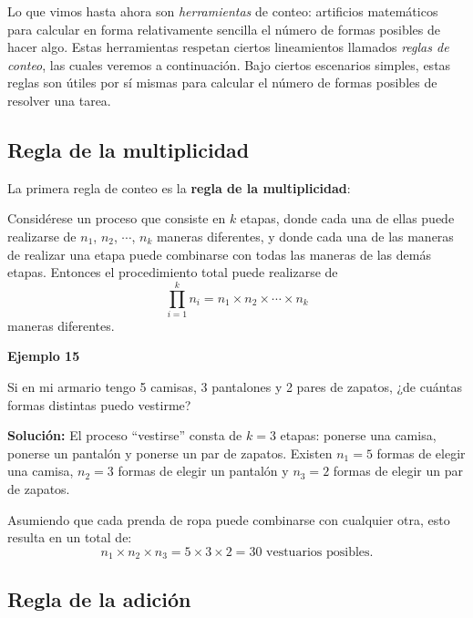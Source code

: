 \documentclass[
  letterpaper,
  DIV=11,
  numbers=noendperiod]{scrreprt}
\begin{document}
Lo que vimos hasta ahora son \emph{herramientas} de conteo: artificios
matemáticos para calcular en forma relativamente sencilla el número de
formas posibles de hacer algo. Estas herramientas respetan ciertos
lineamientos llamados \emph{reglas de conteo}, las cuales veremos a
continuación. Bajo ciertos escenarios simples, estas reglas son útiles
por sí mismas para calcular el número de formas posibles de resolver una
tarea.

\hypertarget{regla-de-la-multiplicidad}{%
\subsection{Regla de la multiplicidad}\label{regla-de-la-multiplicidad}}

La primera regla de conteo es la \textbf{regla de la multiplicidad}:

Considérese un proceso que consiste en \(k\) etapas, donde cada una de
ellas puede realizarse de \(n_1\), \(n_2\), \(\cdots\), \(n_k\) maneras
diferentes, y donde cada una de las maneras de realizar una etapa puede
combinarse con todas las maneras de las demás etapas. Entonces el
procedimiento total puede realizarse de
\[\prod_{i=1}^k n_i = n_1 \times n_2 \times \cdots \times n_k\] maneras
diferentes.

\begin{examplebox}

\begin{center}
\textbf{Ejemplo 15}

\end{center}

Si en mi armario tengo 5 camisas, 3 pantalones y 2 pares de zapatos, ¿de
cuántas formas distintas puedo vestirme?

\textbf{Solución:} El proceso ``vestirse'' consta de \(k=3\) etapas:
ponerse una camisa, ponerse un pantalón y ponerse un par de zapatos.
Existen \(n_1=5\) formas de elegir una camisa, \(n_2=3\) formas de
elegir un pantalón y \(n_3=2\) formas de elegir un par de zapatos.

Asumiendo que cada prenda de ropa puede combinarse con cualquier otra,
esto resulta en un total de:
\[n_1 \times n_2 \times n_3 = 5 \times 3 \times 2 = 30 \text{ vestuarios posibles.}\]

\end{examplebox}

\hypertarget{regla-de-la-adiciuxf3n}{%
\subsection{Regla de la adición}\label{regla-de-la-adiciuxf3n}}
\end{document}
